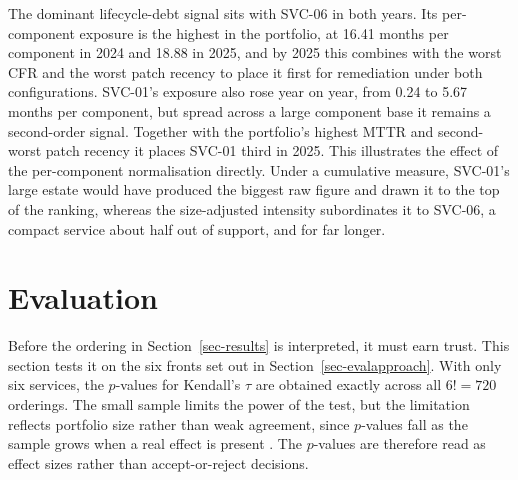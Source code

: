 \documentclass[
  journal,
]{IEEEtran}%
\begin{document}
\begin{table}

\caption{\label{tbl-results2024}TOPSIS results, 2024 (higher \(C_i\),
lower debt priority)}


\end{table}%

The dominant lifecycle-debt signal sits with SVC-06 in both years. Its
per-component exposure is the highest in the portfolio, at 16.41 months
per component in 2024 and 18.88 in 2025, and by 2025 this combines with
the worst CFR and the worst patch recency to place it first for
remediation under both configurations. SVC-01's exposure also rose year
on year, from 0.24 to 5.67 months per component, but spread across a
large component base it remains a second-order signal. Together with the
portfolio's highest MTTR and second-worst patch recency it places SVC-01
third in 2025. This illustrates the effect of the per-component
normalisation directly. Under a cumulative measure, SVC-01's large
estate would have produced the biggest raw figure and drawn it to the
top of the ranking, whereas the size-adjusted intensity subordinates it
to SVC-06, a compact service about half out of support, and for far
longer.

\section{Evaluation}\label{sec-evaluation}

Before the ordering in Section~\ref{sec-results} is interpreted, it must
earn trust. This section tests it on the six fronts set out in
Section~\ref{sec-evalapproach}. With only six services, the \(p\)-values
for Kendall's \(\tau\) are obtained exactly across all \(6! = 720\)
orderings. The small sample limits the power of the test, but the
limitation reflects portfolio size rather than weak agreement, since
\(p\)-values fall as the sample grows when a real effect is present
. The \(p\)-values
are therefore read as effect sizes rather than accept-or-reject
decisions.
\end{document}
